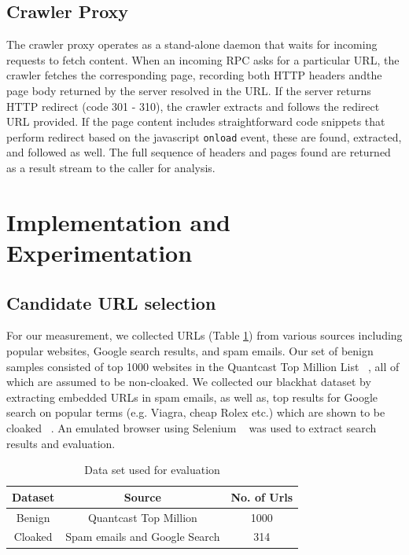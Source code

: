 \documentclass[letterpaper,twocolumn,10pt]{article}
\begin{document}
\subsection{Crawler Proxy}
The crawler proxy operates as a stand-alone daemon that waits for incoming requests to fetch content.  When an incoming RPC asks for a particular URL, the crawler fetches the corresponding page, recording both HTTP headers andthe page body returned by the server resolved in the URL.  If the server returns HTTP redirect (code 301 - 310), the crawler extracts and follows the redirect URL provided.  If the page content includes straightforward code snippets that perform redirect based on the javascript \texttt{onload} event, these are found, extracted, and followed as well.  The full sequence of headers and pages found are returned as a result stream to the caller for analysis.

\section{Implementation and Experimentation}

\subsection{Candidate URL selection}
For our measurement, we collected URLs (Table \ref{tab:dataset}) from various sources including popular websites, Google search results, and spam emails. Our set of benign samples consisted of top 1000 websites in the Quantcast Top Million List ~\cite{quantcast}, all of which are assumed to be non-cloaked. We collected our blackhat dataset by extracting embedded URLs in spam emails, as well as, top results for Google search on popular terms (e.g. Viagra, cheap Rolex etc.) which are shown to be cloaked ~\cite{cloak, Wang:2011:CDD:2046707.2046763}. An emulated browser using Selenium ~\cite{selenium} was used to extract search results and evaluation.

\begin{table}
\begin{center}
\begin{tabular}{|ccc|}
\hline
{\bf Dataset} & {\bf Source} & {\bf No. of Urls} \\
\hline
Benign & Quantcast Top Million & 1000\\
Cloaked & Spam emails and Google Search & 314\\
\hline
\end{tabular}
\end{center}
\caption{Data set used for evaluation}\label{tab:dataset}
\end{table}
\end{document}
